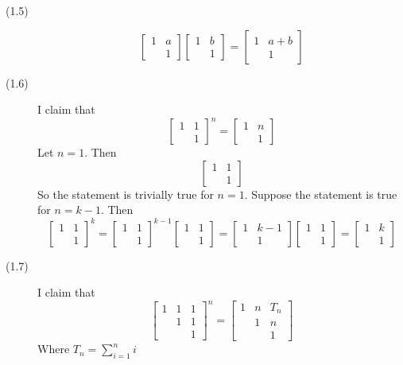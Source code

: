 \documentclass[openany]{book}
\begin{document}
\begin{description}
\item[(1.5)]
$$\begin{bmatrix}
1 & a \\
& 1
\end{bmatrix}\begin{bmatrix}
1 & b \\
& 1
\end{bmatrix} = \begin{bmatrix}
1 & a + b \\
& 1
\end{bmatrix}$$
\item[(1.6)]
I claim that
$$\begin{bmatrix}
1 & 1 \\
& 1
\end{bmatrix}^n = \begin{bmatrix}
1 & n \\
& 1
\end{bmatrix}$$
Let $n = 1$. Then
$$\begin{bmatrix}
1 & 1 \\
& 1
\end{bmatrix}$$
So the statement is trivially true for $n = 1$. Suppose the statement is true for $n = k - 1$. Then
$$\begin{bmatrix}
1 & 1 \\
& 1
\end{bmatrix}^k = \begin{bmatrix}
1 & 1 \\
& 1
\end{bmatrix}^{k-1}\begin{bmatrix}
1 & 1 \\
& 1
\end{bmatrix} = \begin{bmatrix}
1 & k - 1 \\
& 1
\end{bmatrix}\begin{bmatrix}
1 & 1 \\
& 1
\end{bmatrix} = \begin{bmatrix}
1 & k \\
& 1
\end{bmatrix}$$
\item[(1.7)]
I claim that
$$\begin{bmatrix}
1 & 1 & 1 \\
& 1 & 1 \\
& & 1
\end{bmatrix}^n = \begin{bmatrix}
1 & n & T_n \\
& 1 & n \\
& & 1
\end{bmatrix}$$
Where $T_n = \sum_{i=1}^n i$


\end{description}
\end{document}
